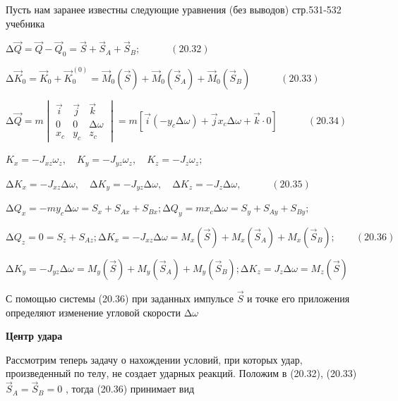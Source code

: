 {\begin{center}
\par Пусть нам заранее известны следующие уравнения (без выводов) стр.531-532 учебника

\par $∆ \vec{Q} = \vec{Q} - \vec{Q}_0 = \vec{S} + \vec{S}_A + \vec{S}_B; \quad\quad\quad (20.32)$

\par $∆ \vec{K}_0 = \vec{K}_0 + \vec{K}_0^{(0)} = \vec{M}_0 (\vec{S}) + \vec{M}_0 (\vec{S}_A) + \vec{M}_0 (\vec{S}_B) \quad\quad\quad (20.33)$

\par $∆ \vec{Q} = m 
\begin{vmatrix}
  \vec{i}& \vec{j}& \vec{k}\\
   0& 0& ∆\omega \\
   x_c& y_c& z_c
\end{vmatrix}
=m[ \vec{i}(-y_c ∆\omega) + \vec{j}x_c ∆\omega + \vec{k}· 0 ] \quad\quad\quad (20.34)$

\par \quad

\par $K_x = -J_{xz} \omega_z, \quad K_y = -J_{yz} \omega_z, \quad K_z = -J_z \omega_z;$

\par \quad

\par $∆K_x = -J_{xz} ∆ \omega, \quad ∆K_y = -J_{yz} ∆ \omega, \quad ∆K_z = -J_z ∆ \omega, \quad\quad\quad (20.35) $

\par \quad

\par $∆ Q_x = -my_c ∆ \omega = S_x + S_{Ax} + S_{Bx}; ∆ Q_y = mx_c ∆ \omega = S_y + S_{Ay} + S_{By};$ 

\par $∆ Q_z = 0 = S_z + S_{Az}; ∆K_x = -J_{xz} ∆ \omega = M_x(\vec{S}) + M_x(\vec{S}_A) + M_x(\vec{S}_B); \quad\quad (20.36)$

\par $∆K_y = -J_{yz} ∆ \omega = M_y(\vec{S}) + M_y(\vec{S}_A) + M_y(\vec{S}_B); ∆K_z = J_{z} ∆ \omega = M_z(\vec{S})$

\par С помощью системы (20.36) при заданных импульсе $\vec{S}$  и точке его приложения определяют изменение угловой скорости $∆ \omega$ 

\par \textbf{Центр удара}

\par Рассмотрим теперь задачу о нахождении условий, при которых удар, произведенный по телу, не создает ударных реакций. Положим в (20.32), (20.33) $\vec{S}_A = \vec{S}_B = 0$ , тогда (20.36) принимает вид


\end{center}}
